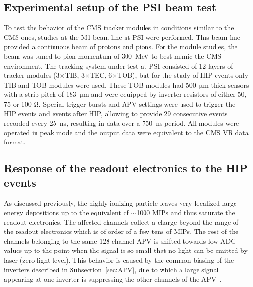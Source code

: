 \subsection{Experimental setup of the PSI beam test}

To test the behavior of the CMS tracker modules in conditions similar to the CMS ones, studies at the M1 beam-line at PSI were performed. This beam-line provided a continuous beam of protons and pions. For the module studies, the beam was tuned to pion momentum of 300~MeV to best mimic the CMS environment. The tracking system under test at PSI consisted of 12 layers of tracker modules (3$\times$TIB, 3$\times$TEC, 6$\times$TOB), but for the study of HIP events only TIB and TOB modules were used. These TOB modules had 500~$\mathrm{\mu m}$ thick sensors with a strip pitch of 183~$\mathrm{\mu}$m and were equipped by inverter resistors of either 50, 75 or 100 $\mathrm{\Omega}$. Special trigger bursts and APV settings were used to trigger the HIP events and events after HIP, allowing to provide 29 consecutive events recorded every 25~ns, resulting in data over a 750~ns period. All modules were operated in peak mode and the output data were equivalent to the CMS VR data format. 




\subsection{Response of the readout electronics to the HIP events}

As discussed previously, the highly ionizing particle leaves very localized large energy depositions up to the equivalent of $\sim$1000 MIPs and thus saturate the readout electronics. The affected channels collect a charge beyond the range of the readout electronics which is of order of a few tens of MIPs. The rest of the channels belonging to the same 128-channel APV is shifted towards low ADC values up to the point when the signal is so small that no light can be emitted by laser (zero-light level). This behavior is caused by the common biasing of the inverters described in Subsection~\ref{sec:APV}, due to which a large signal appearing at one inverter is suppressing the other channels of the APV~\cite{Bainbridge:2004jc}. 

